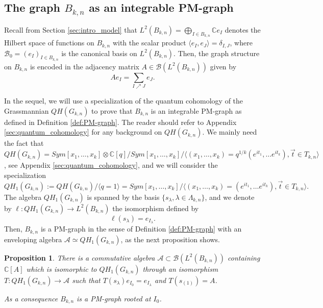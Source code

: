 \documentclass[10pt,11pt]{amsart}%
\newtheorem{proposition}[theorem]{Proposition}
\begin{document}
\subsection{The graph $B_{k,n}$ as an integrable PM-graph}
Recall from Section \ref{sec:intro_model} that $L^2(B_{k,n})=\bigoplus_{I\in B_{k,n}}\mathbb{C} e_{I}$ denotes the Hilbert space of functions on $B_{k,n}$ with the scalar product $\langle e_{I},e_{J}\rangle=\delta_{I,J}$, where $\mathcal{B}_0=(e_{I})_{I\in B_{k,n}}$ is the canonical basis on $L^2(B_{k,n})$. Then, the graph structure on $B_{k,n}$ is encoded in the adjacency matrix $A\in \mathcal{B}(L^2(B_{k,n}))$ given by
$$Ae_I=\sum_{I\nearrow J}e_J.$$

In the sequel, we will use a specialization of the quantum cohomology of the Grassmannian $QH(G_{k,n})$  to prove that $B_{k,n}$ is an integrable PM-graph as defined in Definition \ref{def:PM-graph}. The reader should refer to Appendix \ref{sec:quantum_cohomology} for any background on $QH(G_{k,n})$. We mainly need the fact that $QH(G_{k,n})=Sym[x_1,\ldots,x_k]\otimes \mathbb{C}[q]/Sym[x_1,\ldots,x_k]/\langle (x_1,\ldots,x_k)=q^{1/k}\left(e^{it_1},\ldots e^{it_k}\right), \vec{t}\in T_{k,n}\rangle$, see Appendix \ref{sec:quantum_cohomology}, and we will consider the specialization 
$$QH_{1}(G_{k,n}):=QH(G_{k,n})/\langle q=1\rangle=Sym[x_1,\ldots,x_k]/\langle(x_1,\ldots,x_k)=\left(e^{it_1},\ldots e^{it_k}\right), \vec{t}\in T_{k,n}\rangle.$$
The algebra $QH_{1}(G_{k,n})$ is spanned by the basis $\{s_{\lambda},\lambda\in \Lambda_{k,n}\}$, and we denote by $\ell:QH_1(G_{k,n})\rightarrow L^2(B_{k,n})$ the isomorphism defined by 
$$\ell(s_{\lambda})=e_{I_{\lambda}}.$$ 
Then, $B_{k,n}$ is a PM-graph in the sense of Definition \ref{def:PM-graph} with an enveloping algebra $\mathcal{A}\simeq QH_{1}(G_{k,n})$, as the next proposition shows.
\begin{proposition}\label{prop:equiv_graph_qh}
There is a commutative algebra $\mathcal{A}\subset \mathcal{B}(L^2(B_{k,n}))$ containing $\mathbb{C}[A]$ which is isomorphic to $QH_{1}(G_{k,n})$ through an isomorphism $T:QH_{1}(G_{k,n})\rightarrow\mathcal{A}$ such that $T(s_{\lambda})e_{I_0}=e_{I_{\lambda}}$ and $T(s_{(1)})=A$. 

As a consequence $B_{k,n}$ is a PM-graph rooted at $I_0$.
\end{proposition}
\end{document}

